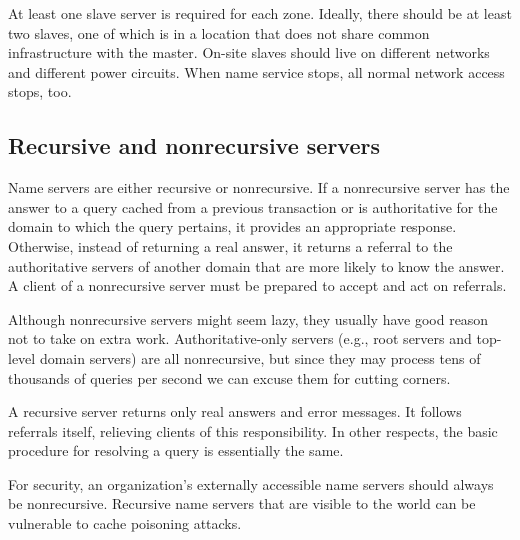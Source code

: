 At least one slave server is required for each zone. Ideally, there
should be at least two slaves, one of which is in a location that does
not share common infrastructure with the master. On-site slaves should
live on different networks and different power circuits. When name
service stops, all normal network access stops, too.

\protect\hypertarget{part0024_split_013.html}{}{}

\hypertarget{part0024_split_013.htmlux5cux23_idContainer1069}{}
\hypertarget{part0024_split_013.htmlux5cux23calibre_pb_12}{%
\subsection[Recursive and nonrecursive
servers]{\texorpdfstring{\protect\hypertarget{part0024_split_013.htmlux5cux23_idTextAnchor857}{}{}Recursive
and nonrecursive
servers}{Recursive and nonrecursive servers}}\label{part0024_split_013.htmlux5cux23calibre_pb_12}}

\protect\hypertarget{part0024_split_013.htmlux5cux23_idIndexMarker2029}{}{}\protect\hypertarget{part0024_split_013.htmlux5cux23_idIndexMarker2030}{}{}Name
servers are either recursive or nonrecursive. If a nonrecursive server
has the answer to a query cached from a previous transaction or is
authoritative for the domain to which the query pertains, it provides an
appropriate response. Otherwise, instead of returning a real answer, it
returns a referral to the authoritative servers of another domain that
are more likely to know the answer. A client of a nonrecursive server
must be prepared to accept and act on referrals.

Although nonrecursive servers might seem lazy, they usually have good
reason not to take
\protect\hypertarget{part0024_split_013.htmlux5cux23_idIndexMarker2031}{}{}on
extra work. Authoritative-only servers (e.g.,
\protect\hypertarget{part0024_split_013.htmlux5cux23_idIndexMarker2032}{}{}root
servers and top-level domain servers) are all nonrecursive, but since
they may process tens of thousands of queries per second we can excuse
them for cutting corners.

A recursive server returns only real answers and error messages. It
follows referrals itself, relieving clients of this responsibility. In
other respects, the basic procedure for resolving a query is essentially
the same.

For security, an organization's externally accessible name servers
should always be nonrecursive. Recursive name servers that are visible
to the world can be vulnerable to cache poisoning attacks.

